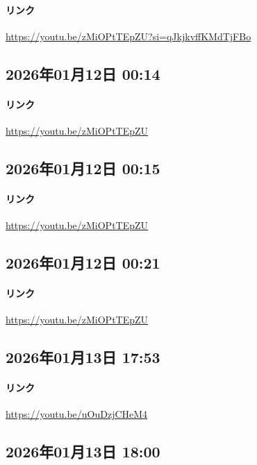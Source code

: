 \paragraph{リンク}
\url{https://youtu.be/zMiOPtTEpZU?si=qJkjkvffKMdTjFBo}

\subsection*{2026年01月12日 00:14}

\paragraph{リンク}
\url{https://youtu.be/zMiOPtTEpZU}

\subsection*{2026年01月12日 00:15}

\paragraph{リンク}
\url{https://youtu.be/zMiOPtTEpZU}

\subsection*{2026年01月12日 00:21}

\paragraph{リンク}
\url{https://youtu.be/zMiOPtTEpZU}

\subsection*{2026年01月13日 17:53}

\paragraph{リンク}
\url{https://youtu.be/uOuDzjCHeM4}

\subsection*{2026年01月13日 18:00}

